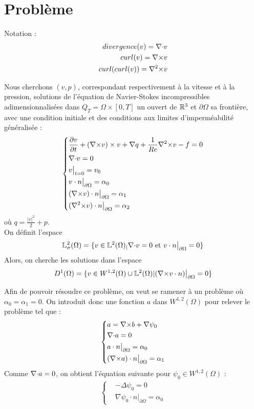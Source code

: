 \section{Problème}
Notation : 
\begin{eqnarray*}
divergence(v)={\nabla\cdot} v\\
curl(v)={\nabla\times} v\\
curl(curl(v))={\nabla^2\times} v
\end{eqnarray*}

Nous cherchons $(v,p)$, correspondant respectivement à la vitesse et à la pression, solutions de l'équation de Navier-Stokes incompressibles adimensionnalisées dans $Q_T=\Omega\times[0,T]$ un ouvert de ${\mathbb{R}}^3$ et $\partial\Omega$ sa frontière, avec une condition initiale et des conditions aux limites d'imperméabilité généralisée :
\begin{eqnarray}
\label{depart}
\left\{
\begin{aligned}
&\frac{\partial v}{\partial t} + ({\nabla\times}  v)\times v + \nabla q + \frac{1}{Re}{\nabla^2\times}  v-f = 0\\
&{\nabla\cdot} v = 0\\
&v\big\rvert_{t=0} = v_0\\
&v\cdot n\big\rvert_{\partial\Omega} = \alpha_0\\
&({\nabla\times}  v)\cdot n\big\rvert_{\partial\Omega} = \alpha_1\\
&({\nabla^2\times}  v)\cdot n\big\rvert_{\partial\Omega} = \alpha_2
\end{aligned}
\right.
\end{eqnarray}
où $q = \frac{|v|^2}{2}+p$.\\

On définit l'espace
\[
{\mathbb{L}}^2_\sigma(\Omega) = \{v \in {\mathbb{L}}^2(\Omega)_| {\nabla\cdot} v = 0\text{ et }v\cdot n\big\rvert_{\partial\Omega} = 0 \}
\]
Alors, on cherche les solutions dans l'espace
\[
D^1(\Omega) = \{v\in W^{1,2}(\Omega) \cup {\mathbb{L}}^2(\Omega) | ({\nabla\times} v\cdot n)\big\rvert_{\partial\Omega} = 0  \}
\]

Afin de pouvoir résoudre ce problème, on veut se ramener à un problème où $\alpha_0=\alpha_1=0$. On introduit donc une fonction $a$ dans $W^{1,2}(\Omega)$ pour relever le problème tel que :
\begin{eqnarray}
\label{aegal}
\left\{
\begin{aligned}
&a={\nabla\times} b+\nabla\psi_0\\
&{\nabla\cdot} a =0\\
&a\cdot n\big\rvert_{\partial\Omega} = \alpha_0\\
&({\nabla\times} a)\cdot n\big\rvert_{\partial\Omega} = \alpha_1
\end{aligned}
\right.
\end{eqnarray}
Comme ${\nabla\cdot} a=0$, on obtient l'équation suivante pour $\psi_0\in W^{1,2}(\Omega)$ :
\begin{eqnarray}
\label{psi0}
\left\{
\begin{aligned}
&-\Delta\psi_0 = 0\\
&\nabla\psi_0\cdot n\big\rvert_{\partial\Omega}=\alpha_0
\end{aligned}
\right.
\end{eqnarray}

